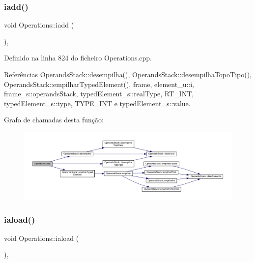 \subsubsection{\texorpdfstring{iadd()}{iadd()}}
{\footnotesize\ttfamily void Operations\+::iadd (\begin{DoxyParamCaption}{ }\end{DoxyParamCaption})\hspace{0.3cm}{\ttfamily [static]}, {\ttfamily [private]}}



Definido na linha 824 do ficheiro Operations.\+cpp.



Referências Operands\+Stack\+::desempilha(), Operands\+Stack\+::desempilha\+Topo\+Tipo(), Operands\+Stack\+::empilhar\+Typed\+Element(), frame, element\+\_\+u\+::i, frame\+\_\+s\+::operands\+Stack, typed\+Element\+\_\+s\+::real\+Type, R\+T\+\_\+\+I\+NT, typed\+Element\+\_\+s\+::type, T\+Y\+P\+E\+\_\+\+I\+NT e typed\+Element\+\_\+s\+::value.

Grafo de chamadas desta função\+:
\nopagebreak
\begin{figure}[H]
\begin{center}
\leavevmode
\includegraphics[width=350pt]{classOperations_a12d5933f0d0c91c578b76edb1971a2be_cgraph}
\end{center}
\end{figure}
\mbox{\label{classOperations_a77f3b4c161fee7fbd6bb89b170400c0c}} 
\subsubsection{\texorpdfstring{iaload()}{iaload()}}
{\footnotesize\ttfamily void Operations\+::iaload (\begin{DoxyParamCaption}{ }\end{DoxyParamCaption})\hspace{0.3cm}{\ttfamily [static]}, {\ttfamily [private]}}



